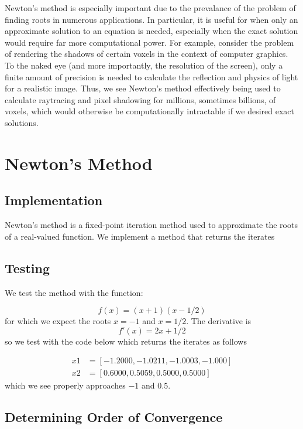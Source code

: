 \documentclass[11pt]{article}
\begin{document}
Newton's method is especially important due to the prevalance of the problem of finding roots in numerous applications. In particular, it is useful for when only an approximate solution to an equation is needed, especially when the exact solution would require far more computational power. For example, consider the problem of rendering the shadows of certain voxels in the context of computer graphics. To the naked eye (and more importantly, the resolution of the screen), only a finite amount of precision is needed to calculate the reflection and physics of light for a realistic image. Thus, we see Newton's method effectively being used to calculate raytracing and pixel shadowing for millions, sometimes billions, of voxels, which would otherwise be computationally intractable if we desired exact solutions.


\section{Newton's Method}

\subsection{Implementation}

Newton's method is a fixed-point iteration method used to approximate the roots of a real-valued function. We implement a method that returns the iterates

\subsection{Testing}

We test the method with the function:

$$
f(x) = (x + 1)(x - 1/2)
$$
for which we expect the roots $x = -1$ and $x = 1/2$. The derivative is
$$
f'(x) = 2x + 1/2
$$
so we test with the code below which returns the iterates as follows

\begin{align*}
x1 &= [-1.2000, -1.0211, -1.0003, -1.000] \\
x2 &= [0.6000, 0.5059, 0.5000, 0.5000]
\end{align*}
which we see properly approaches $-1$ and $0.5$.

\subsection{Determining Order of Convergence}
\end{document}
